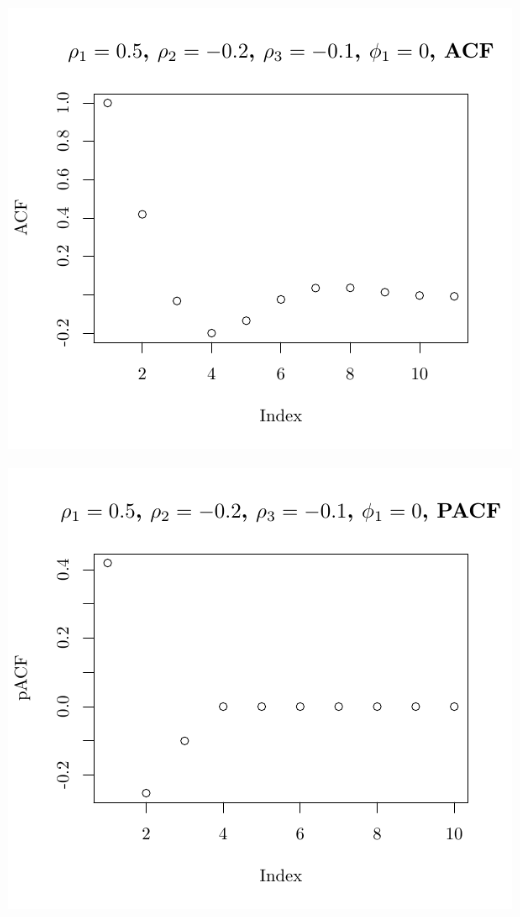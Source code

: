 \documentclass[10pt]{paper}\usepackage[]{graphicx}\usepackage[]{color}
\makeatletter
\def\maxwidth{ %
  \ifdim\Gin@nat@width>\linewidth
    \linewidth
  \else
    \Gin@nat@width
  \fi
}
\newenvironment{knitrout}{}{} %
\makeatother
\begin{document}
\begin{knitrout}
{\centering \includegraphics[width=\maxwidth]{figure/graphics-plotter-105} 

}




{\centering \includegraphics[width=\maxwidth]{figure/graphics-plotter-106} 

}





\end{knitrout}
\end{document}
